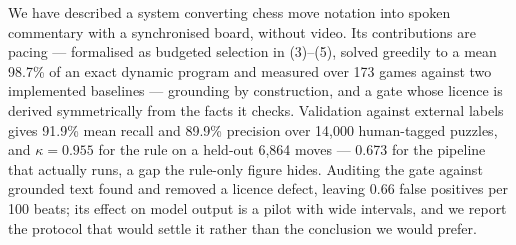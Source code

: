 \documentclass[conference]{IEEEtran}
\begin{document}
We have described a system converting chess move notation into spoken
commentary with a synchronised board, without video. Its contributions are
pacing --- formalised as budgeted selection in (3)--(5), solved greedily to
a mean 98.7\% of an exact dynamic program and measured over 173 games
against two implemented baselines --- grounding by construction, and a gate
whose licence is derived symmetrically from the facts it checks. Validation
against external labels gives 91.9\% mean recall and 89.9\% precision over
14,000 human-tagged puzzles, and $\kappa = 0.955$ for the rule on a held-out
6,864 moves --- 0.673 for the pipeline that actually runs, a gap the
rule-only figure hides. Auditing the gate against grounded text found and
removed a licence defect, leaving 0.66 false positives per 100 beats; its
effect on model output is a pilot with wide intervals, and we report the
protocol that would settle it rather than the conclusion we would prefer.
\end{document}
